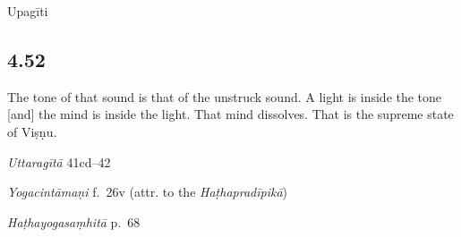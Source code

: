\begin{ekdosis}



\begin{metre}[hp04_051]
Upagīti 
\end{metre}


\subsection*{4.52}
\begin{translation}[hp04_052]
The tone of that sound is that of the unstruck sound. A light is inside the tone [and] the mind is inside the light. That mind dissolves. That is the supreme state of Viṣṇu.
\end{translation}

\begin{sources}[hp04_052]
\emph{Uttaragītā} 41cd–42 %
\begin{versinnote}
\end{versinnote}
\end{sources}

\begin{testimonia}[hp04_052]
\emph{Yogacintāmaṇi} f.~26v (attr. to the \emph{Haṭhapradīpikā})
\begin{versinnote}
\end{versinnote}

\emph{Haṭhayogasaṃhitā} p.~68
\begin{versinnote}
\end{versinnote}
\end{testimonia}


\end{ekdosis}
